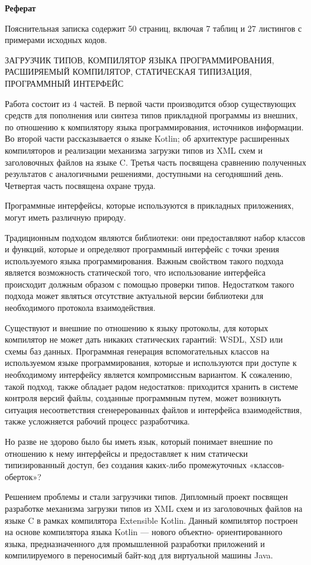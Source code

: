 \documentclass[a4paper,12pt]{article}
\newcommand{\ssection}[1]{\section*{#1}{\centering #1}}
\begin{document}
\begin{center}
\Large\bfseries
Реферат
\end{center}
Пояснительная записка содержит 50 страниц, включая 7 таблиц и 27 листингов с примерами исходных кодов.

ЗАГРУЗЧИК ТИПОВ, КОМПИЛЯТОР ЯЗЫКА ПРОГРАММИРОВАНИЯ, РАСШИРЯЕМЫЙ КОМПИЛЯТОР, СТАТИЧЕСКАЯ ТИПИЗАЦИЯ, ПРОГРАММНЫЙ ИНТЕРФЕЙС

Работа состоит из 4 частей. В первой части производится обзор существующих средств для пополнения или синтеза типов прикладной программы из внешних, по отношению к компилятору языка программирования, источников информации. Во второй части рассказывается о языке Kotlin; об архитектуре расширенных компиляторов и реализации механизма загрузки типов из XML схем и заголовочных файлов на языке C. Третья часть посвящена сравнению полученных результатов с аналогичными решениями, доступными на сегодняшний день. Четвертая часть посвящена охране труда.

Программные интерфейсы, которые используются в прикладных приложениях, могут иметь различную природу.

Традиционным подходом являются библиотеки: они предоставляют набор классов и функций, которые и определяют программный интерфейс с точки зрения используемого языка программирования. Важным свойством такого подхода является возможность статической того, что использование интерфейса происходит должным образом с помощью проверки типов. Недостатком такого подхода может являться отсутствие актуальной версии библиотеки для необходимого протокола взаимодействия.

Существуют и внешние по отношению к языку протоколы, для которых компилятор не может дать никаких статических гарантий: WSDL, XSD или схемы баз данных.
Программная генерация вспомогательных классов на используемом языке программирования, которые и используются при доступе к необходимому интерфейсу является компромиссным вариантом. К сожалению, такой подход, также обладает радом недостатков: приходится хранить в системе контроля версий файлы, созданные программным путем, может возникнуть ситуация несоответствия сгенерерованных файлов и интерфейса взаимодействия, также усложняется рабочий процесс разработчика.

Но разве не здорово было бы иметь язык, который понимает внешние по отношению к нему интерфейсы и предоставляет к ним статически типизированный доступ, без создания каких-либо промежуточных «классов-оберток»?

Решением проблемы и стали загрузчики типов. Дипломный проект посвящен разработке механизма загрузки типов из XML схем и из заголовочных файлов на языке C в рамках компилятора Extensible Kotlin. Данный компилятор построен на основе компилятора языка Kotlin — нового объектно- ориентированного языка, предназначенного для промышленной разработки приложений и компилируемого в переносимый байт-код для виртуальной машины Java.
\end{document}
